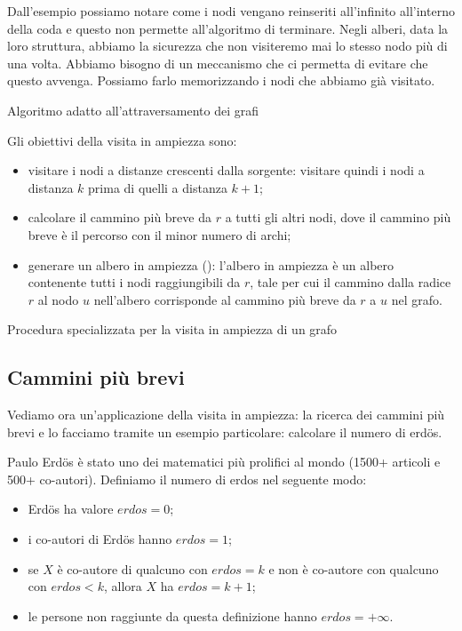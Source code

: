 Dall'esempio possiamo notare come i nodi vengano reinseriti all'infinito all'interno della coda e questo non permette all'algoritmo di terminare.
Negli alberi, data la loro struttura, abbiamo la sicurezza che non visiteremo mai lo stesso nodo più di una volta.
Abbiamo bisogno di un meccanismo che ci permetta di evitare che questo avvenga.
Possiamo farlo memorizzando i nodi che abbiamo già visitato.

\begin{algorithm}[H]
	\caption[]{Algoritmo adatto all'attraversamento dei grafi}
	
\end{algorithm}

\clearpage
Gli obiettivi della visita in ampiezza sono:
\begin{itemize}
	\item visitare i nodi a distanze crescenti dalla sorgente: visitare quindi i nodi a distanza \(k\) prima di quelli a distanza \(k+1\);
	\item calcolare il cammino più breve da \(r\) a tutti gli altri nodi, dove il cammino più breve è il percorso con il minor numero di archi;
	\item generare un albero in ampiezza (): l'albero in ampiezza è un albero contenente tutti i nodi raggiungibili da \(r\), tale per cui il cammino dalla radice \(r\) al nodo \(u\) nell'albero corrisponde al cammino più breve da \(r\) a \(u\) nel grafo.
\end{itemize}

\begin{algorithm}[H]
	\caption[]{Procedura specializzata per la visita in ampiezza di un grafo}
	
\end{algorithm}

\clearpage
\subsection{Cammini più brevi}

Vediamo ora un'applicazione della visita in ampiezza: la ricerca dei cammini più brevi e lo facciamo tramite un esempio particolare: calcolare il numero di erd\"{o}s.

Paulo Erd\"{o}s è stato uno dei matematici più prolifici al mondo (1500+ articoli e 500+ co-autori).
Definiamo il numero di erdos nel seguente modo:
\begin{itemize}
	\item Erd\"{o}s ha valore \(erdos = 0\);
	\item i co-autori di Erd\"{o}s hanno \(erdos = 1\);
	\item se \(X\) è co-autore di qualcuno con \(erdos = k\) e non è co-autore con qualcuno con \(erdos < k\), allora \(X\) ha \(erdos = k+1\);
	\item le persone non raggiunte da questa definizione hanno \(erdos = +\infty\).
\end{itemize}


